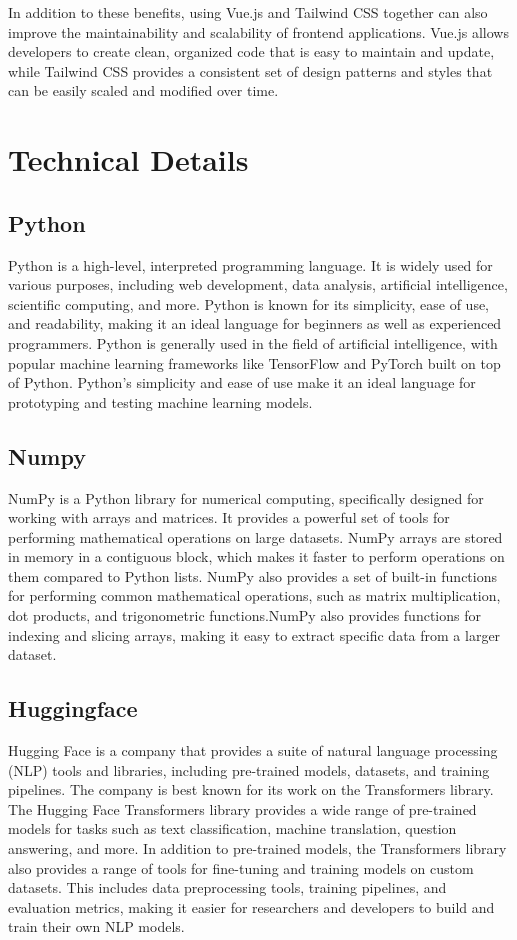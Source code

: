 \documentclass[12pt]{report}
\begin{document}
In addition to these benefits, using Vue.js and Tailwind CSS together can also improve the maintainability and scalability of frontend applications. Vue.js allows developers to create clean, organized code that is easy to maintain and update, while Tailwind CSS provides a consistent set of design patterns and styles that can be easily scaled and modified over time.

 \section{Technical Details}
 \subsection{Python}
Python is a high-level, interpreted programming language. It is widely used for various purposes, including web development, data analysis, artificial intelligence, scientific computing, and more. Python is known for its simplicity, ease of use, and readability, making it an ideal language for beginners as well as experienced programmers. Python is generally used in the field of artificial intelligence, with popular machine learning frameworks like TensorFlow and PyTorch built on top of Python. Python's simplicity and ease of use make it an ideal language for prototyping and testing machine learning models.
 \subsection{Numpy}
NumPy is a Python library for numerical computing, specifically designed for working with arrays and matrices. It provides a powerful set of tools for performing mathematical operations on large datasets.
NumPy arrays are stored in memory in a contiguous block, which makes it faster to perform operations on them compared to Python lists. NumPy also provides a set of built-in functions for performing common mathematical operations, such as matrix multiplication, dot products, and trigonometric functions.NumPy also provides functions for indexing and slicing arrays, making it easy to extract specific data from a larger dataset.
 \subsection{Huggingface}
Hugging Face is a company that provides a suite of natural language processing (NLP) tools and libraries, including pre-trained models, datasets, and training pipelines. The company is best known for its work on the Transformers library. The Hugging Face Transformers library provides a wide range of pre-trained models for tasks such as text classification, machine translation, question answering, and more. In addition to pre-trained models, the Transformers library also provides a range of tools for fine-tuning and training models on custom datasets. This includes data preprocessing tools, training pipelines, and evaluation metrics, making it easier for researchers and developers to build and train their own NLP models.
\end{document}
